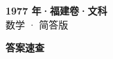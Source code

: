 \documentclass[zihao=-4, a4paper]{ctexart}
\begin{document}
\begin{center}
  {\Large\bfseries 1977 年·福建卷·文科}\\[4pt]
  {\large 数学 · 简答版}
\end{center}
\medskip
{}

\clearpage
{}
\begin{center}{\Large\bfseries 答案速查}\end{center}
\medskip

\end{document}

